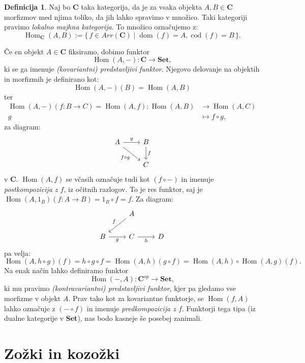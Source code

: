 \documentclass[12pt,a4paper]{book}
\theoremstyle{definition}
\newtheorem{definicija}{Definicija}[chapter]
\theoremstyle{plain}
\theoremstyle{definition}
\theoremstyle{remark}
\newcommand{\cat}[1]{\textbf{#1}}
\DeclareMathOperator{\Hom}{Hom}
\DeclareMathOperator{\dom}{dom}
\DeclareMathOperator{\cod}{cod}
\renewcommand{\set}[1]{\{\,#1\,\}}
\begin{document}
\begin{definicija}

Naj bo $\cat{C}$ taka kategorija, da je za vsaka objekta $A,B \in \cat{C}$ morfizmov med njima toliko, da jih lahko spravimo v množico. Taki kategoriji pravimo \emph{lokalno majhna kategorija}. To množico označujemo z:
$$\Hom_{\cat{C}}(A,B) := \set{f \in Arr(\cat{C}) \mid \dom(f) = A, \cod(f) = B}.$$
\end{definicija}
Če en objekt $A \in \cat{C}$ fiksiramo, dobimo funktor
$$\Hom(A,-) : \cat{C} \to \cat{Set},$$
ki se ga imenuje \emph{(kovariantni) predstavljivi funktor}. Njegovo delovanje na objektih in morfizmih je definirano kot:
$$\Hom(A,-)(B) = \Hom(A,B)$$
ter
\begin{align*}
\Hom(A,-)(f : B \to C) = \Hom(A,f): \Hom(A,B) &\to \Hom(A,C) \\
g &\mapsto f \circ g,
\end{align*}
za diagram:
$$ \begin{tikzcd}
A \ar[r, "g"] \ar[rd, "f \circ g"'] & B \ar[d, "f"] \\
& C
\end{tikzcd} $$
v $\cat{C}$. $\Hom(A,f)$ se včasih označuje tudi kot $(f \circ -)$ in imenuje \emph{postkompozicija z $f$}, iz očitnih razlogov.
To je res funktor, saj je $\Hom(A,1_B)(f:A \to B) = 1_B \circ f = f$. Za diagram: 
$$ \begin{tikzcd}
& A \ar[dl, "f"'] & \\
B \ar[r, "g"'] & C \ar[r, "h"'] & D
\end{tikzcd} $$
pa velja:
$$
\Hom(A,h \circ g)(f) = h \circ g \circ f = \Hom(A,h)(g \circ f) = \Hom(A,h) \circ \Hom(A,g)(f).
$$
Na enak način lahko definiramo funktor
$$\Hom(-,A) : \cat{C}^{op} \to \cat{Set},$$
ki mu pravimo \emph{(kontravariantni) predstavljivi funktor},
kjer pa gledamo vse morfizme v objekt $A$. Prav tako kot za kovariantne funktorje, se $\Hom(f,A)$ lahko označuje z $(- \circ f)$ in imenuje \emph{predkompozicija z $f$}. Funktorji tega tipa (iz dualne kategorije v \cat{Set}), nas bodo kasneje še posebej zanimali.

\section{Zožki in kozožki}
\end{document}

